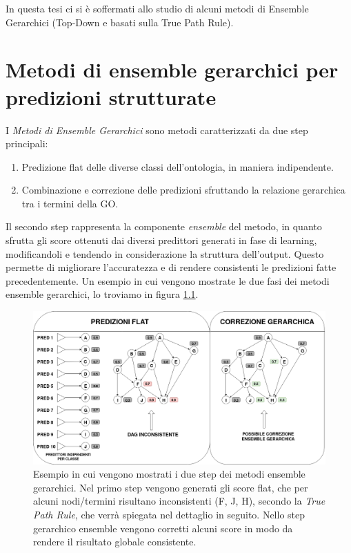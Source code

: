 \documentclass[12pt]{report}
\begin{document}
In questa tesi ci si è soffermati allo studio di alcuni metodi di Ensemble Gerarchici (Top-Down e  basati sulla True Path Rule).
\chapter{Metodi di ensemble gerarchici per predizioni strutturate}
I \emph{Metodi di Ensemble Gerarchici}\cite{valentiniMethods}  sono metodi caratterizzati da due step principali:
\begin{enumerate}
\item Predizione flat delle diverse classi dell'ontologia, in maniera indipendente.
\item Combinazione e correzione delle predizioni sfruttando la relazione gerarchica tra i termini della GO.
\end{enumerate}
Il secondo step rappresenta la componente \emph{ensemble} del metodo, in quanto sfrutta gli score ottenuti dai diversi predittori generati in fase di learning, modificandoli e tendendo in considerazione la struttura dell'output. Questo permette di migliorare l'accuratezza e di rendere consistenti le predizioni fatte precedentemente. Un esempio in cui vengono mostrate le due fasi dei metodi ensemble gerarchici, lo troviamo in figura \ref{exhierarchical}.
\begin{figure}[h]
\centering
\includegraphics[scale=0.29]{./images/exensemble.png}
\caption{\footnotesize{Esempio in cui vengono mostrati i due step dei metodi ensemble gerarchici. Nel primo step vengono generati gli score flat, che per alcuni nodi/termini risultano inconsistenti (F, J, H), secondo la \emph{True Path Rule}, che verrà spiegata nel dettaglio in seguito. Nello step gerarchico ensemble vengono corretti alcuni score in modo da rendere il risultato globale consistente.}}
\label{exhierarchical}
\end{figure}
\end{document}
